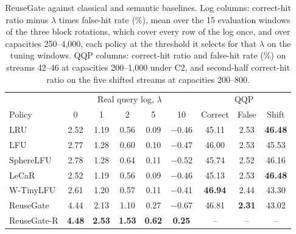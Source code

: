 \documentclass[authoryear,preprint,review,12pt]{elsarticle}
\begin{document}
\begin{table}[htbp]
\centering
\caption{ReuseGate against classical and semantic baselines. Log columns: correct-hit ratio minus $\lambda$ times false-hit rate (\%), mean over the 15 evaluation windows of the three block rotations, which cover every row of the log once, and over capacities 250--4,000, each policy at the threshold it selects for that $\lambda$ on the tuning windows. QQP columns: correct-hit ratio and false-hit rate (\%) on streams 42--46 at capacities 200--1,000 under C2, and second-half correct-hit ratio on the five shifted streams at capacities 200--800.}
\label{tab:learned_admission}
\footnotesize
\setlength{\tabcolsep}{3.5pt}
\begin{tabular}{lccccc|ccc}
\toprule
 & \multicolumn{5}{c|}{Real query log, $\lambda$} & \multicolumn{3}{c}{QQP} \\
Policy & 0 & 1 & 2 & 5 & 10 & Correct & False & Shift \\
\midrule
LRU & 2.52 & 1.19 & 0.56 & 0.09 & $-$0.46 & 45.11 & 2.53 & \textbf{46.48} \\
LFU & 2.77 & 1.28 & 0.60 & 0.10 & $-$0.47 & 46.00 & 2.53 & 45.53 \\
SphereLFU & 2.78 & 1.28 & 0.64 & 0.11 & $-$0.52 & 45.74 & 2.52 & 46.16 \\
LeCaR & 2.52 & 1.19 & 0.56 & 0.09 & $-$0.46 & 45.13 & 2.53 & \textbf{46.48} \\
W-TinyLFU & 2.61 & 1.20 & 0.57 & 0.11 & $-$0.41 & \textbf{46.94} & 2.44 & 43.30 \\
ReuseGate & 4.44 & 2.13 & 1.10 & 0.27 & $-$0.67 & 46.81 & \textbf{2.31} & 43.02 \\
ReuseGate-R & \textbf{4.48} & \textbf{2.53} & \textbf{1.53} & \textbf{0.62} & \textbf{0.25} & -- & -- & -- \\
\bottomrule
\end{tabular}
\end{table}
\end{document}
